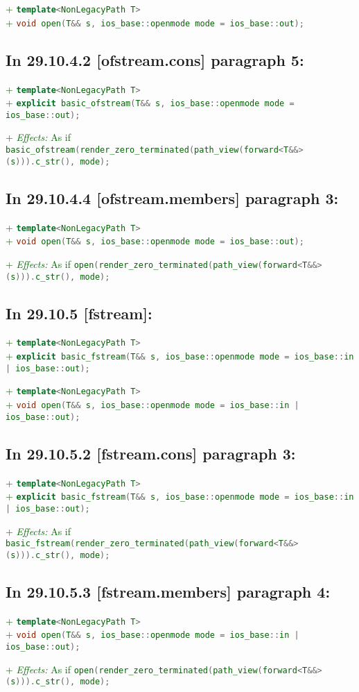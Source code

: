 \documentclass[11pt]{article}
\newcommand{\code}[2][cpp]{\lstinline[language=#1,basicstyle=\small\ttfamily]{#2}}
\newcommand{\desc}[1]{\textit{#1}}
\newcommand{\effects}{\desc{Effects: }}
\newcommand{\tsrefp}[3]{\subsection*{In #2 \textbf{[#1]} paragraph #3:}}
\newcommand{\tsref}[2]{\subsection*{In #2 \textbf{[#1]}:}}
\newcommand{\tsreplace}[3]{\textcolor{red}{\sout{#1}}#2\textcolor{darkgreen}{#3}}
\begin{document}
\tsreplace{}{}{+ \code{template<NonLegacyPath T>}}\\
\tsreplace{}{}{+ \code{void open(T&& s, ios_base::openmode mode = ios_base::out);}}


\tsrefp{ofstream.cons}{29.10.4.2}{5}

\tsreplace{}{}{+ \code{template<NonLegacyPath T>}}\\
\tsreplace{}{}{+ \code{explicit basic_ofstream(T&& s,
ios_base::openmode mode = ios_base::out);}}

\tsreplace{}{}{+ \effects As if \code{basic_ofstream(render_zero_terminated(path_view(forward<T&&>(s))).c_str(), mode);}}

\tsrefp{ofstream.members}{29.10.4.4}{3}

\tsreplace{}{}{+ \code{template<NonLegacyPath T>}}\\
\tsreplace{}{}{+ \code{void open(T&& s, ios_base::openmode mode = ios_base::out);}}

\tsreplace{}{}{+ \effects As if \code{open(render_zero_terminated(path_view(forward<T&&>(s))).c_str(), mode);}}


\tsref{fstream}{29.10.5}

\tsreplace{}{}{+ \code{template<NonLegacyPath T>}}\\
\tsreplace{}{}{+ \code{explicit basic_fstream(T&& s, ios_base::openmode mode = ios_base::in | ios_base::out);}}

\tsreplace{}{}{+ \code{template<NonLegacyPath T>}}\\
\tsreplace{}{}{+ \code{void open(T&& s, ios_base::openmode mode = ios_base::in | ios_base::out);}}


\tsrefp{fstream.cons}{29.10.5.2}{3}

\tsreplace{}{}{+ \code{template<NonLegacyPath T>}}\\
\tsreplace{}{}{+ \code{explicit basic_fstream(T&& s, ios_base::openmode mode = ios_base::in | ios_base::out);}}

\tsreplace{}{}{+ \effects As if \code{basic_fstream(render_zero_terminated(path_view(forward<T&&>(s))).c_str(), mode);}}


\tsrefp{fstream.members}{29.10.5.3}{4}

\tsreplace{}{}{+ \code{template<NonLegacyPath T>}}\\
\tsreplace{}{}{+ \code{void open(T&& s, ios_base::openmode mode = ios_base::in | ios_base::out);}}

\tsreplace{}{}{+ \effects As if \code{open(render_zero_terminated(path_view(forward<T&&>(s))).c_str(), mode);}}
\end{document}
